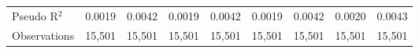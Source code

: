 {\begin{tabular}{l*{8}{c}}
Pseudo R$ ^2$&   0.0019         &   0.0042         &   0.0019         &   0.0042         &   0.0019         &   0.0042         &   0.0020         &   0.0043         \\
Observations&   15,501         &   15,501         &   15,501         &   15,501         &   15,501         &   15,501         &   15,501         &   15,501         \\
\bottomrule
\end{tabular}
}

